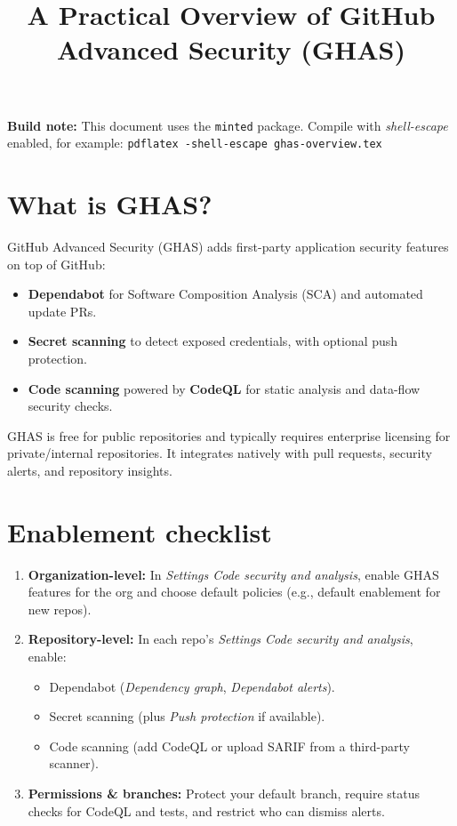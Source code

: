 \documentclass[11pt]{article}
\title{A Practical Overview of GitHub Advanced Security (GHAS)}
\author{}
\date{}
\begin{document}
\maketitle

\begin{tcolorbox}
\textbf{Build note:} This document uses the \texttt{minted} package. Compile with \emph{shell-escape} enabled, for example:
\texttt{pdflatex -shell-escape ghas-overview.tex}
\end{tcolorbox}

\section{What is GHAS?}
GitHub Advanced Security (GHAS) adds first-party application security features on top of GitHub:
\begin{itemize}
  \item \textbf{Dependabot} for Software Composition Analysis (SCA) and automated update PRs.
  \item \textbf{Secret scanning} to detect exposed credentials, with optional push protection.
  \item \textbf{Code scanning} powered by \textbf{CodeQL} for static analysis and data-flow security checks.
\end{itemize}
GHAS is free for public repositories and typically requires enterprise licensing for private/internal repositories. It integrates natively with pull requests, security alerts, and repository insights.

\section{Enablement checklist}
\begin{enumerate}
  \item \textbf{Organization-level:} In \emph{Settings \textrightarrow Code security and analysis}, enable GHAS features for the org and choose default policies (e.g., default enablement for new repos).
  \item \textbf{Repository-level:} In each repo's \emph{Settings \textrightarrow Code security and analysis}, enable:
    \begin{itemize}
      \item Dependabot (\emph{Dependency graph}, \emph{Dependabot alerts}).
      \item Secret scanning (plus \emph{Push protection} if available).
      \item Code scanning (add CodeQL or upload SARIF from a third-party scanner).
    \end{itemize}
  \item \textbf{Permissions \& branches:} Protect your default branch, require status checks for CodeQL and tests, and restrict who can dismiss alerts.
\end{enumerate}
\newpage
\end{document}
